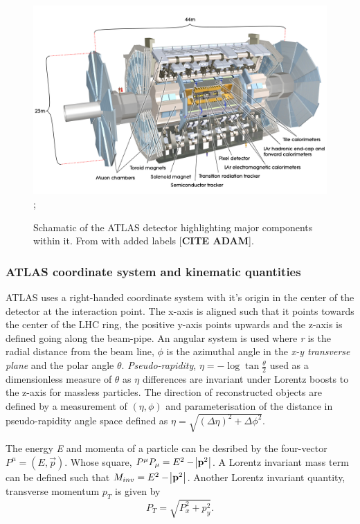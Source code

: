 \begin{figure}
    \centering
    \includegraphics[width=\textwidth]{images/ATLAS.png};
    \caption[Schamatic of the ATLAS detector]{Schamatic of the ATLAS detector highlighting major 
            components within it.
            From \cite{ATLASImage} with added labels [\textbf{CITE ADAM}].}
    \label{fig:method:ATLAS}
\end{figure}

\subsubsection{ATLAS coordinate system and kinematic quantities}

ATLAS uses a right-handed coordinate system with it's origin in the center of the detector at the 
interaction point. The x-axis is aligned such that it points towards the center of the LHC ring, the positive y-axis points upwards and the z-axis is defined going along the beam-pipe. An angular system is used where \emph{r} is the radial distance from the beam line, \emph{$\phi$} is the azimuthal angle in the \emph{x-y transverse plane} and the polar angle \emph{$\theta$}. \emph{Pseudo-rapidity}, $\eta = -\log\tan\frac{\theta}{2}$ used as a dimensionless measure of \emph{$\theta$} as \emph{$\eta$} differences are invariant under Lorentz boosts to the z-axis for massless particles. The direction of reconstructed objects are defined by a measurement of $(\eta,\phi)$ and parameterisation of the distance in pseudo-rapidity angle space defined as $\eta = \sqrt{(\Delta\eta)^{2} + {\Delta\phi}^{2}}$.

The energy \emph{E} and momenta \emph{} of a particle can be desribed by the four-vector $P^{\mu} = (E,\vec{p})$. Whose square, $P^{\mu}P_{\mu} = E^{2} - \abs{\boldsymbol{\mathbf{p}}^{2}}$. A Lorentz invariant mass term can be defined such that $M_{inv} = E^{2} - \abs{\boldsymbol{\mathbf{p}}^{2}}$. Another Lorentz invariant quantity, transverse momentum \emph{$p_{T}$} is given by
\begin{equation}
    P_{T} = \sqrt{ P_{x}^{2} + p_{y}^{2}}.
\end{equation}

